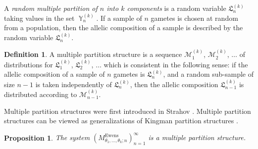 \documentclass[12pt]{amsart}
\newtheorem{prop}[thm]{Proposition}
\theoremstyle{definition}
\newtheorem{defn}[thm]{Definition}
\numberwithin{equation}{section}
\DeclareMathOperator{\Y}{\mathbb{Y}}
\DeclareMathOperator{\Ewens}{Ewens}
\begin{document}
A  \textit{random multiple partition of $n$ into $k$ components} is a random variable $\mathfrak{L}_n^{(k)}$
taking values in the set $\Y_n^{(k)}$. If a sample of $n$ gametes is chosen at random from a population, then the allelic composition of a sample is described by the random variable $\mathfrak{L}_n^{(k)}$.
\begin{defn}\label{DefinitionMultiplePartitionStructure} A multiple partition structure is a sequence $\mathcal{M}_1^{(k)}$, $\mathcal{M}^{(k)}_2$, $\ldots$ of distributions for $\mathfrak{L}_1^{(k)}$, $\mathfrak{L}_2^{(k)}$,
$\ldots$ which is consistent in the following sense: if the allelic composition of a sample of $n$ gametes is $\mathfrak{L}_n^{(k)}$, and a random sub-sample of size $n-1$ is taken independently of
$\mathfrak{L}_n^{(k)}$, then the allelic composition $\mathfrak{L}_{n-1}^{(k)}$ is distributed according to
$\mathcal{M}_{n-1}^{(k)}$.
\end{defn}
Multiple partition structures were first introduced in Strahov
\cite{StrahovMPS}. Multiple partition structures can be viewed as
generalizations of Kingman partition structures \cite{Kingman1, Kingman2}.
\begin{prop}\label{PropositionMEWENSMPS}The system $\left(M_{\theta_1,\ldots,\theta_k;n}^{\Ewens}\right)_{n=1}^{\infty}$ is a multiple partition structure.
\end{prop}
\end{document}
